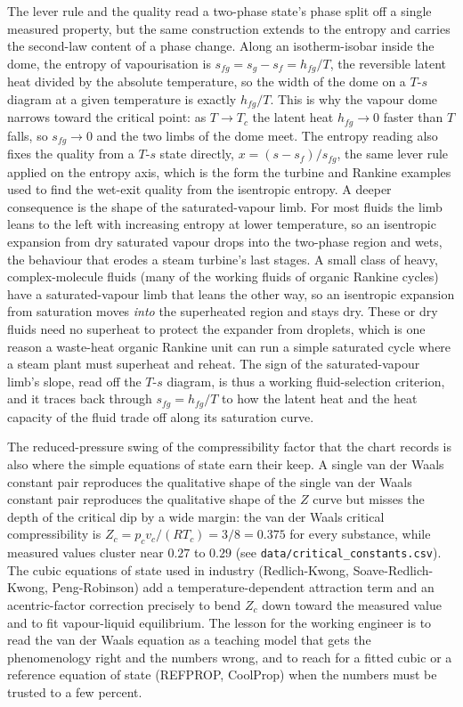 \begin{mastery}
The lever rule and the quality read a two-phase state's phase split off a
single measured property, but the same construction extends to the entropy
and carries the second-law content of a phase change. Along an isotherm-isobar
inside the dome, the entropy of vapourisation is $s_{fg} = s_g - s_f =
h_{fg}/T$, the reversible latent heat divided by the absolute temperature, so
the width of the dome on a $T$-$s$ diagram at a given temperature is exactly
$h_{fg}/T$. This is why the vapour dome narrows toward the critical point: as
$T \to T_c$ the latent heat $h_{fg} \to 0$ faster than $T$ falls, so $s_{fg}
\to 0$ and the two limbs of the dome meet. The entropy reading also fixes the
quality from a $T$-$s$ state directly, $x = (s - s_f)/s_{fg}$, the same lever
rule applied on the entropy axis, which is the form the turbine and Rankine
examples used to find the wet-exit quality from the isentropic entropy. A
deeper consequence is the shape of the saturated-vapour limb. For most fluids
the limb leans to the left with increasing entropy at lower temperature, so an
isentropic expansion from dry saturated vapour drops into the two-phase
region and wets, the behaviour that erodes a steam turbine's last stages. A
small class of heavy, complex-molecule fluids (many of the working fluids of
organic Rankine cycles) have a saturated-vapour limb that leans the other way,
so an isentropic expansion from saturation moves \emph{into} the superheated
region and stays dry. These  or dry fluids need no
superheat to protect the expander from droplets, which is one reason a
waste-heat organic Rankine unit can run a simple saturated cycle where a steam
plant must superheat and reheat. The sign of the saturated-vapour limb's slope,
read off the $T$-$s$ diagram, is thus a working fluid-selection criterion, and
it traces back through $s_{fg} = h_{fg}/T$ to how the latent heat and the
heat capacity of the fluid trade off along its saturation curve.
\end{mastery}

\begin{mastery}
The reduced-pressure swing of the compressibility factor that the chart
records is also where the simple equations of state earn their keep. A
single van der Waals constant pair reproduces the qualitative shape of the
single van der Waals constant pair reproduces the qualitative shape of the
$Z$ curve but misses the depth of the critical dip by a wide margin: the
van der Waals critical compressibility is $Z_c = p_c v_c/(R T_c) = 3/8 =
0.375$ for every substance, while measured values cluster near $0.27$ to
$0.29$ (see \texttt{data/critical\_constants.csv}). The cubic equations of
state used in industry (Redlich-Kwong, Soave-Redlich-Kwong,
Peng-Robinson) add a temperature-dependent attraction term and an
acentric-factor correction precisely to bend $Z_c$ down toward the
measured value and to fit vapour-liquid equilibrium. The lesson for the
working engineer is to read the van der Waals equation as a teaching
model that gets the phenomenology right and the numbers wrong, and to
reach for a fitted cubic or a reference equation of state (REFPROP,
CoolProp) when the numbers must be trusted to a few percent.
\end{mastery}

